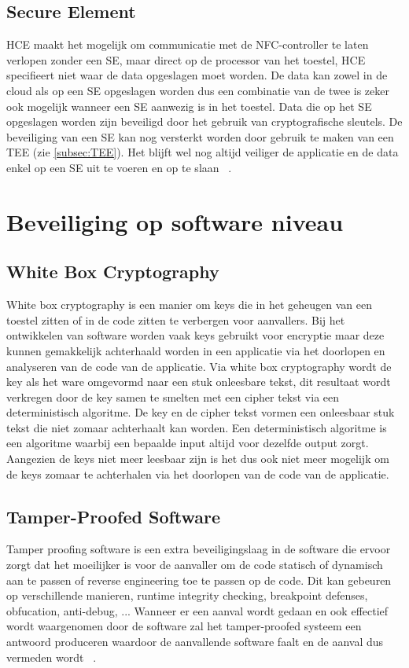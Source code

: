 \subsection{Secure Element}
HCE maakt het mogelijk om communicatie met de NFC-controller te laten verlopen zonder een SE, maar direct op de processor van het toestel, HCE specifieert niet waar de data opgeslagen moet worden. De data kan zowel in de cloud als op een SE opgeslagen worden dus een combinatie van de twee is zeker ook mogelijk wanneer een SE aanwezig is in het toestel. Data die op het SE opgeslagen worden zijn beveiligd door het gebruik van cryptografische sleutels. De beveiliging van een SE kan nog versterkt worden door gebruik te maken van een TEE (zie \ref{subsec:TEE}). Het blijft wel nog altijd veiliger de applicatie en de data enkel op een SE uit te voeren en op te slaan ~\autocite{SCA2014}.


\section{Beveiliging op software  niveau}

\subsection{White Box Cryptography}
White box cryptography is een manier om keys die in het geheugen van een toestel zitten of in de code zitten te verbergen voor aanvallers. Bij het ontwikkelen van software worden vaak keys gebruikt voor encryptie maar deze kunnen gemakkelijk achterhaald worden in een applicatie via het doorlopen en analyseren van de code van de applicatie. Via white box cryptography wordt de key als het ware omgevormd naar een stuk onleesbare tekst, dit resultaat wordt verkregen door de key samen te smelten met een cipher tekst via een deterministisch algoritme. De key en de cipher tekst vormen een onleesbaar stuk tekst die niet zomaar achterhaalt kan worden. Een deterministisch algoritme is een algoritme waarbij een bepaalde input altijd voor dezelfde output zorgt. Aangezien de keys niet meer leesbaar zijn is het dus ook niet meer mogelijk om de keys zomaar te achterhalen via het doorlopen van de code van de applicatie.

\subsection{Tamper-Proofed Software}
Tamper proofing software is een extra beveiligingslaag in de software die ervoor zorgt dat het moeilijker is voor de aanvaller om de code statisch of dynamisch aan te passen of reverse engineering toe te passen op de code. Dit kan gebeuren op verschillende manieren, runtime integrity checking, breakpoint defenses,  obfucation, anti-debug, ... Wanneer er een aanval wordt gedaan en ook effectief wordt waargenomen door de software zal het tamper-proofed systeem een antwoord produceren waardoor de aanvallende software faalt en de aanval dus vermeden wordt ~\autocite{SCA2014}.


